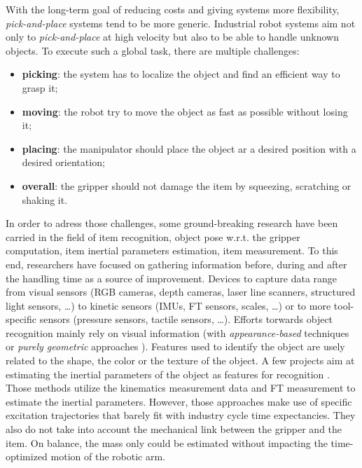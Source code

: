 \documentclass[/home/francois/latex/report/main.tex]{subfiles}
\begin{document}
With the long-term goal of reducing costs and giving systems more flexibility, \textit{pick-and-place} systems tend to be more generic. Industrial robot systems aim not only to \textit{pick-and-place} at high velocity but also to be able to handle unknown objects. To execute such a global task, there are multiple challenges:
\begin{itemize}
	\item \textbf{picking}: the system has to localize the object and find an efficient way to grasp it;
	\item \textbf{moving}: the robot try to move the object as fast as possible without losing it;
	\item \textbf{placing}: the manipulator should place the object ar a desired position with a desired orientation;
	\item \textbf{overall}: the gripper should not damage the item by squeezing, scratching or shaking it.
\end{itemize}

In order to adress those challenges, some ground-breaking research have been carried in the field of item recognition, object pose w.r.t. the gripper computation, item inertial parameters estimation, item measurement. To this end, researchers have focused on gathering information before, during and after the handling time as a source of improvement. Devices to capture data range from visual sensors (RGB cameras, depth cameras, laser line scanners, structured light sensors, \ldots) to kinetic sensors (\ac{IMUs}, \ac{FT} sensors, scales, \ldots) or to more tool-specific sensors (pressure sensors, tactile sensors, \ldots). Efforts torwards object recognition mainly rely on visual information (with \textit{appearance-based} techniques \cite{Carmichael2002, Schmid1997, Viola2001, Murase1993} or \textit{purely geometric} approaches \cite{Hut1987, Sethi2001}). Features used to identify the object are usely related to the shape, the color or the texture of the object. A few projects aim at estimating the inertial parameters of the object as features for recognition \cite{Kubus2008, Kubus2007, Kubus2014, Farsoni2018}. Those methods utilize the kinematics measurement data and \ac{FT} measurement to estimate the inertial parameters. However, those approaches make use of specific excitation trajectories that barely fit with industry cycle time expectancies. They also do not take into account the mechanical link between the gripper and the item. On balance, the mass only could be estimated without impacting the time-optimized motion of the robotic arm.
\end{document}

